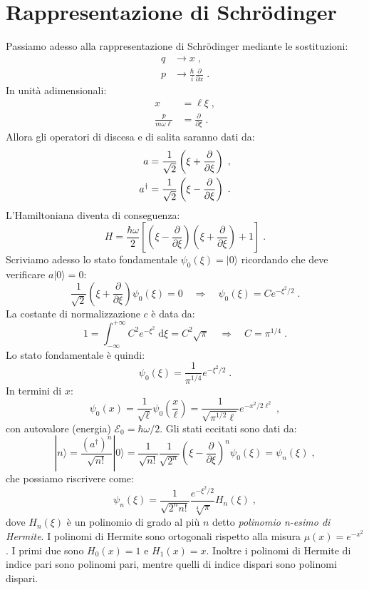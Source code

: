 \documentclass[12pt,a4paper]{report}
\theoremstyle{definition}
\numberwithin{equation}{section}
\newcommand{\diff}[1][]{\mathrm{d}#1}
\newcommand{\ket}{\rangle}
\newcommand{\Sch}{Schrödinger}
\newcommand{\adj}[1]{#1^{\dagger}}
\begin{document}
\section{Rappresentazione di \Sch}
Passiamo adesso alla rappresentazione di \Sch\; mediante le sostituzioni:
\begin{align*}
q &\longrightarrow x \;,\\
p &\longrightarrow \frac{\hbar}{i}\frac{\partial}{\partial x}\;.
\end{align*}
In unità adimensionali:
\begin{align*}
x&=\ell\xi\;, \\
\frac{p}{m\omega\ell}&= \frac{\partial}{\partial\xi}\;.
\end{align*}
Allora gli operatori di discesa e di salita saranno dati da:
\begin{align}
a&=\frac{1}{\sqrt{2}}\left(\xi+\frac{\partial}{\partial\xi}\right)\;, \notag \\
\adj{a}&=\frac{1}{\sqrt{2}}\left(\xi-\frac{\partial}{\partial\xi}\right)\;.
\end{align}
L'Hamiltoniana diventa di conseguenza:
\begin{equation}
H=\frac{\hbar\omega}{2}\left[\left(\xi-\frac{\partial}{\partial\xi}\right)\left(\xi+\frac{\partial}{\partial\xi}\right)+1\right]\;.
\end{equation}
Scriviamo adesso lo stato fondamentale $\psi_0(\xi)=|0\ket$ ricordando che deve verificare $a|0\ket=0$:
\begin{equation}
\frac{1}{\sqrt{2}}\left(\xi+\frac{\partial}{\partial\xi}\right)\psi_0(\xi)=0\quad  \Longrightarrow \quad \psi_0(\xi)=Ce^{-\xi^2/2}\;.
\end{equation}
La costante di normalizzazione $c$ è data da:
$$
1=\int_{-\infty}^{+\infty}C^2e^{-\xi^2}\;\diff{\xi}=C^2\sqrt{\pi}\quad \Longrightarrow \quad C=\pi^{1/4}\;.
$$
Lo stato fondamentale è quindi:
\begin{equation}
\psi_0(\xi)=\frac{1}{\pi^{1/4}}e^{-\xi^2/2}\;.
\end{equation}
In termini di $x$:
\begin{equation}
\psi_0(x)=\frac{1}{\sqrt{\ell}}\psi_0\left(\frac{x}{\ell}\right)=\frac{1}{\sqrt{\pi^{1/2}\ell}}e^{-x^2/2\ell^2}\;,
\end{equation}
con autovalore (energia) $\mathcal{E}_0=\hbar\omega/2$. Gli stati eccitati sono dati da:
\begin{equation}
|n\ket=\frac{(\adj{a})^n}{\sqrt{n!}}|0\ket=\frac{1}{\sqrt{n!}}\frac{1}{\sqrt{2^n}}\left(\xi-\frac{\partial}{\partial\xi}\right)^n\psi_0(\xi)=\psi_n(\xi)\;,
\end{equation}
che possiamo riscrivere come:
\begin{equation}
\psi_n(\xi)=\frac{1}{\sqrt{2^n n!}}\frac{e^{-\xi^2/2}}{\sqrt[4]{\pi}}H_n(\xi)\;,
\end{equation}
dove $H_n(\xi)$ è un polinomio di grado al più $n$ detto \textit{polinomio n-esimo di Hermite}. I polinomi di Hermite sono ortogonali rispetto alla misura $\mu(x)=e^{-x^2}$. I primi due sono $H_0(x)=1$ e $H_1(x)=x$. Inoltre i polinomi di Hermite di indice pari sono polinomi pari, mentre quelli di indice dispari sono polinomi dispari.
\end{document}
